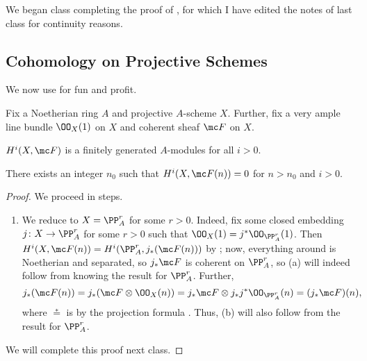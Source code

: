 \documentclass[../notes.tex]{subfiles}
\begin{document}
We began class completing the proof of , for which I have edited the notes of last class for continuity reasons.

\subsection{Cohomology on Projective Schemes}
We now use  for fun and profit.
\begin{theorem}
	Fix a Noetherian ring $A$ and projective $A$-scheme $X$. Further, fix a very ample line bundle $\OO_X(1)$ on $X$ and coherent sheaf $\mc F$ on $X$.
	\begin{listalph}
		\item $H^i(X,\mc F)$ is a finitely generated $A$-modules for all $i>0$.
		\item There exists an integer $n_0$ such that $H^i(X,\mc F(n))=0$ for $n>n_0$ and $i>0$.
	\end{listalph}
\end{theorem}
\begin{proof}
	We proceed in steps.
	\begin{enumerate}
		\item We reduce to $X=\PP^r_A$ for some $r>0$. Indeed, fix some closed embedding $j\colon X\to\PP^r_A$ for some $r>0$ such that $\OO_X(1)=j^*\OO_{\PP^r_A}(1)$. Then $H^i(X,\mc F(n))=H^i(\PP^r_A,j_*(\mc F(n)))$ by ; now, everything around is Noetherian and separated, so $j_*\mc F$ is coherent on $\PP^r_A$, so (a) will indeed follow from knowing the result for $\PP^r_A$. Further,
		\[j_*(\mc F(n))=j_*(\mc F\otimes\OO_X(n))=j_*\mc F\otimes j_*j^*\OO_{\PP^r_A}(n)=(j_*\mc F)(n),\]
		where $\stackrel*=$ is by the projection formula \cite[Exercise~II.5.1]{hartshorne}. Thus, (b) will also follow from the result for $\PP^r_A$.
	\end{enumerate}
	We will complete this proof next class.
\end{proof}
\end{document}
